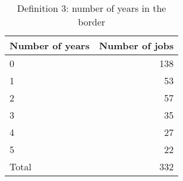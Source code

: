 \begin{table}[h!]
	\caption{Definition 3: number of years in the border}
	\centering
	\begin{tabular}{lr}
	\toprule
Number of years & Number of jobs \\
\midrule
0&138 \\
1&53 \\
2&57 \\
3&35 \\
4&27 \\
5&22 \\
Total&332 \\
\bottomrule
\end{tabular}
\end{table}
